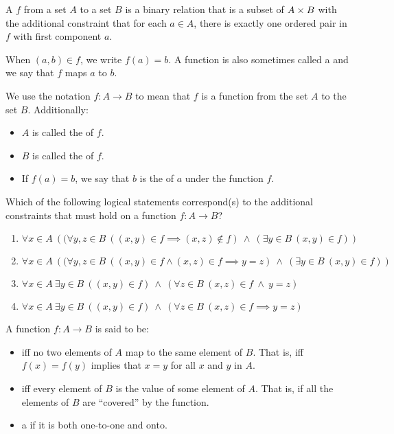 \begin{defn}[Functions]
A  $f$ from a set $A$ to a set $B$ is a binary relation that is a subset of $A \times B$ with the additional constraint that for each $a \in A$, there is exactly one ordered pair in $f$ with first component $a$.

When $(a, b) \in f$, we write $f(a) = b$. A function is also sometimes called a  and we say that $f$ maps $a$ to $b$.

We use the notation $f : A \to B$ to mean that $f$ is a function from the set $A$ to the set $B$. Additionally:
\begin{itemize}
\item $A$ is called the  of $f$.
\item $B$ is called the  of $f$.
\item If $f(a) = b$, we say that $b$ is the  of $a$ under the function $f$.
\end{itemize}
\end{defn}

\begin{exer}
Which of the following logical statements correspond(s) to the additional constraints that must hold on a function $f : A \to B$?
\begin{enumerate}[label=(\alph*)]
\item $\forall x \in A\ \left(
		(\forall y, z \in B\ ((x, y) \in f \implies (x, z) \notin f) 
		\ \land\ (\exists y \in B\ (x, y) \in f )
		\right)$
\item $\forall x \in A\  \left(            %
		(\forall y, z \in B\ ((x, y) \in f \wedge (x, z) \in f \implies y = z) 
		\ \land\ (\exists y \in B\ (x, y) \in f )
		\right)$
\item $\forall x \in A\ \exists y \in B\ 
		((x, y) \in f) \ \land\  (\forall z \in B\ (x, z) \in f \ \land\ y = z )  $
\item $\forall x \in A\ \exists y \in B\ 
		((x, y) \in f) \ \land\  (\forall z \in B\  (x, z) \in f \implies y = z )  $
\end{enumerate}
\end{exer}

\begin{defn}
A function $f : A \to B$ is said to be:
\begin{itemize}
\item {} iff no two elements of $A$ map to the same element of $B$. That is, iff $f(x) = f(y)$ implies that $x = y$ for all $x$ and $y$ in $A$.
\item {} iff every element of $B$ is the value of some element of $A$. That is, if all the elements of $B$ are ``covered'' by the function. 
\item a \defterm{bijection} if it is both one-to-one and onto.
\end{itemize}
\end{defn}

